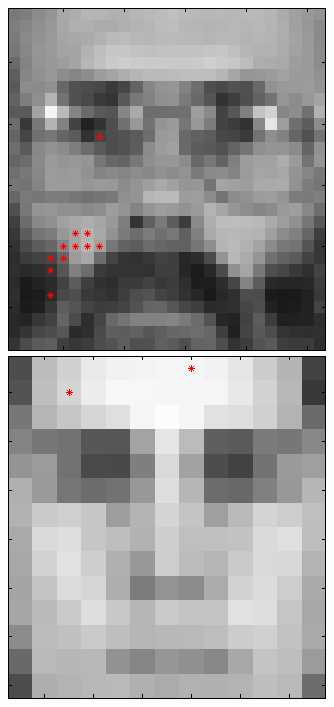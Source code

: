 \begin{figure}[ht]
 \includegraphics[width=\textwidth*11/100]{ch5/figures/XM2VTS_8_0.png}\\
 \includegraphics[width=\textwidth*11/100]{ch5/figures/XM2VTS_1_1.png}

\end{figure}

